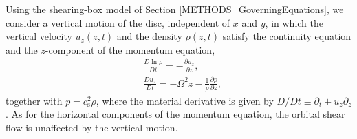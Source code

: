 \documentclass[fleqn,usenatbib]{mnras}
\begin{document}
Using the shearing-box model of Section \ref{METHODS_GoverningEquations}, we consider a vertical motion of the disc, independent of $x$ and $y$, in which the vertical velocity $u_z(z,t)$ and the density $\rho(z,t)$ satisfy the continuity equation and the $z$-component of the momentum equation,
\begin{align}
    &\frac{D \ln{\rho}}{D t} = - \frac{\partial u_z}{\partial z},\label{EQUATION_1DTheoryContinuityEquation}\\
    &\frac{D u_z}{D t} = -\Omega^2 z - \frac{1}{\rho}\frac{\partial p}{\partial z},\label{EQUATION_1DTheoryMomentumEquation}
\end{align}
together with $p=c_\text{s}^2\rho$, where the material derivative is given by $D/Dt \equiv \partial_t + u_z \partial_z$.
As for the horizontal components of the momentum equation, the orbital shear flow is unaffected by the vertical motion.
\end{document}
